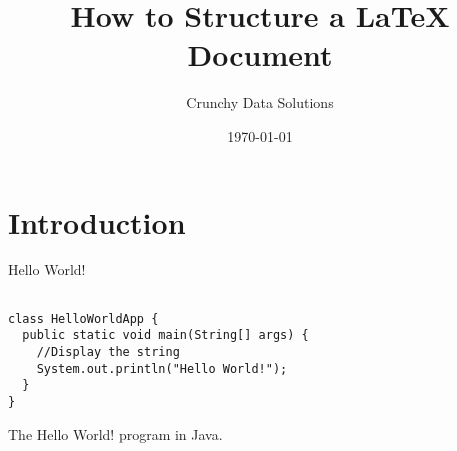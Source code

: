 \documentclass[titlepage]{article}
\begin{document}

\title{How to Structure a \LaTeX{} Document}
\author{Crunchy Data Solutions}
\date{\today}
\maketitle

\newpage

\section{Introduction}

Hello World!

\begin{program}
  \begin{verbatim}

class HelloWorldApp {
  public static void main(String[] args) {
    //Display the string
    System.out.println("Hello World!");
  }
}
\end{verbatim}
  \caption{The Hello World! program in Java.}
\end{program}
\end{document}
